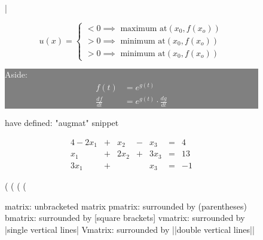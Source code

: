 {\begin{figure}[H]
    \setlength\itemsep{1em}

    \allowdisplaybreaks

    \bigg|

    \usepackage{amsmath}
    \DeclareMathOperator{\sss}{ss}

    \usepackage{amssymb}
    \newcommand{\R}{\mathbb{R}}

    \[
    u(x) =
    \begin{cases}
        < 0 \implies \mbox{ maximum at} (x_0, f(x_o)) \\
        > 0 \implies \mbox{ minimum at} (x_0, f(x_o)) \\
        > 0 \implies \mbox{ minimum at} (x_0, f(x_o))
    \end{cases}
    \]

\colorbox{gray}
{
    \parbox{\textwidth}
    {
        \textcolor{white}
        {
            Aside:\\
            \begin{align*}
                f(t) & = e^{g(t) } \\
                \frac{ df }{ dt } & = e^{g(t)}  \cdot \frac{ dg }{ dt }
            \end{align*}
        }
    }
}

    have defined: "augmat" snippet

\begin{alignat*}{4}
    -2 x_1  & { }+{ } & x_2  & { }-{ } & x_3   & { }={ } & 4 \\
        x_1 & { }+{ } & 2x_2 & { }+{ } & 3x_3  & { }={ } & 13 \\
      3 x_1 & { }+{ } &      &           & x_3 & { }={ } & -1
\end{alignat*}

     \big(
     \bigg(
     \Big(
     \Bigg(


    \therefore


    \pm

    matrix:  unbracketed matrix
    pmatrix: surrounded by (parentheses)
    bmatrix: surrounded by [square brackets]
    vmatrix: surrounded by |single vertical lines|
    Vmatrix: surrounded by ||double vertical lines||


\end{figure}}

